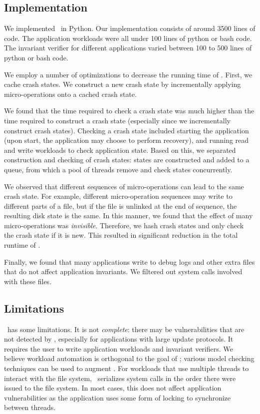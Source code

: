 \subsection{Implementation}
\label{sec-implementation}
We implemented \toolname\ in Python. Our implementation consists of around
3500 lines of code. The application workloads were all under 100 lines of
python or bash code. The invariant verifier for different applications varied
between 100 to 500 lines of python or bash code. 

We employ a number of optimizations to decrease the running time of \toolname.
First, we cache crash states. We construct a new crash state by
incrementally applying micro-operations onto a cached crash state. 

We found that the time required to check a crash state was much higher than
the time required to construct a crash state (especially since we
incrementally construct crash states). Checking a crash state included
starting the application (upon start, the application may choose to perform
recovery), and running read and write workloads to check application state.
Based on this, we separated construction and checking of crash states: states
are constructed and added to a queue, from which a pool of threads remove and
check states concurrently. 

We observed that different sequences of micro-operations can lead to the same
crash state. For example, different micro-operation sequences may write to
different parts of a file, but if the file is unlinked at the end of sequence,
the resulting disk state is the same. In this manner, we found that the effect
of many micro-operations was \textit{invisible}. Therefore, we hash
crash states and only check the crash state if it is new. This resulted in
significant reduction in the total runtime of \toolname.       

Finally, we found that many applications write to debug logs and other extra
files that do not affect application invariants. We filtered out system calls
involved with these files. 

\subsection{Limitations}
\label{sec-discuss}
\toolname\ has some limitations. It is not \textit{complete}: there may be
vulnerabilities that are not detected by \toolname, especially for
applications with large update protocols. It requires the user to write
application workloads and invariant verifiers. We believe workload automation
is orthogonal to the goal of \toolname; various model checking techniques can
be used to augment \toolname. For workloads that use multiple threads to
interact with the file system, \toolname\ serializes system calls in the order
there were issued to the file system. In most cases, this does not affect
application vulnerabilities as the application uses some form of locking to
synchronize between threads. 

